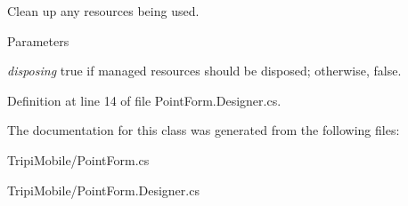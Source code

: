 Clean up any resources being used. 
\begin{DoxyParams}{Parameters}
\item[{\em disposing}]true if managed resources should be disposed; otherwise, false.\end{DoxyParams}


Definition at line 14 of file PointForm.Designer.cs.

The documentation for this class was generated from the following files:\begin{DoxyCompactItemize}
\item 
TripiMobile/PointForm.cs\item 
TripiMobile/PointForm.Designer.cs\end{DoxyCompactItemize}
